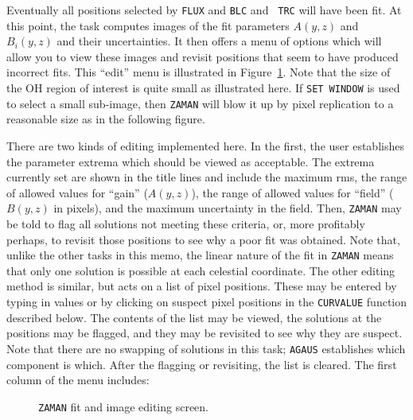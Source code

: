 \documentclass[twoside]{article}
\newcommand{\putfig}[1]{\texttt{[image: \#1.eps]}}
\begin{document}
Eventually all positions selected by {\tt FLUX} and {\tt BLC} and {\tt
  TRC} will have been fit.  At this point, the task computes images of
the fit parameters $A(y,z)$ and $B_i(y,z)$ and their uncertainties.
It then offers a menu of options which will allow you to view these
images and revisit positions that seem to have produced incorrect
fits.  This ``edit'' menu is illustrated in
Figure~\ref{fig:ZAMAN.edit}.  Note that the size of the OH region
of interest is quite small as illustrated here.  If {\tt SET
  WINDOW} is used to select a small sub-image, then {\tt ZAMAN} will
blow it up by pixel replication to a reasonable size as in the
  following figure.

There are two kinds of editing implemented here.  In the first, the
user establishes the parameter extrema which should be viewed as
acceptable.  The extrema currently set are shown in the title lines
and include the maximum rms, the range of allowed values for ``gain''
($A(y,z)$), the range of allowed values for ``field'' ($B(y,z)$ in
pixels), and the maximum uncertainty in the field.  Then, {\tt ZAMAN}
may be told to flag all solutions not meeting these criteria, or, more
profitably perhaps, to revisit those positions to see why a poor fit
was obtained.  Note that, unlike the other tasks in this memo, the
linear nature of the fit in {\tt ZAMAN} means that only one solution
is possible at each celestial coordinate.  The other editing method is
similar, but acts on a list of pixel positions.  These may be entered
by typing in values or by clicking on suspect pixel positions in the
{\tt CURVALUE} function described below.  The contents of the list may
be viewed, the solutions at the positions may be flagged, and they may
be revisited to see why they are suspect.  Note that there are no
swapping of solutions in this task; {\tt AGAUS} establishes which
component is which.  After the flagging or revisiting, the list is
cleared.  The first column of the menu includes:

\begin{figure}
\begin{center}
\resizebox{5.5in}{!}{\putfig{ZAMAN.edit}}
\caption{{\tt ZAMAN} fit and image editing screen.}
\label{fig:ZAMAN.edit}
\end{center}
\end{figure}
\end{document}
